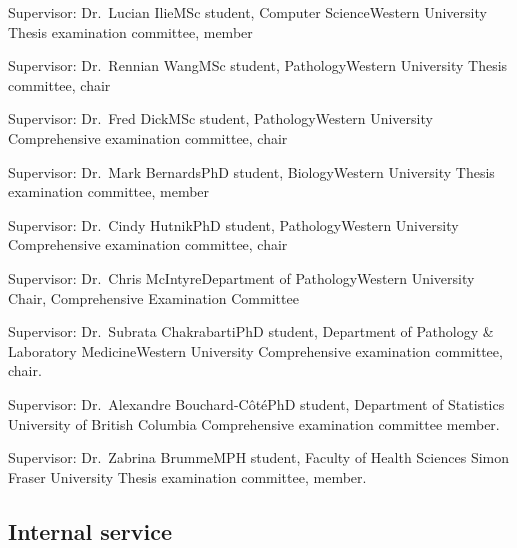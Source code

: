{Supervisor: Dr.~Lucian Ilie}{MSc student, Computer Science}{Western University}
{Thesis examination committee, member}


{Supervisor: Dr.~Rennian Wang}{MSc student, Pathology}{Western University}
{Thesis committee, chair}

{Supervisor: Dr.~Fred Dick}{MSc student, Pathology}{Western University}
{Comprehensive examination committee, chair}

{Supervisor: Dr.~Mark Bernards}{PhD student, Biology}{Western University}
{Thesis examination committee, member}

{Supervisor: Dr.~Cindy Hutnik}{PhD student, Pathology}{Western University}
{Comprehensive examination committee, chair}



{Supervisor: Dr.~Chris McIntyre}{Department of Pathology}{Western University}
{Chair, Comprehensive Examination Committee}


{Supervisor: Dr.~Subrata Chakrabarti}{PhD student, Department of Pathology \& Laboratory Medicine}{Western University}
{Comprehensive examination committee, chair.}


{Supervisor: Dr.~Alexandre Bouchard-C\^ot\'e}{PhD student, Department of Statistics}
{University of British Columbia}
{Comprehensive examination committee member.}

{Supervisor: Dr.~Zabrina Brumme}{MPH student, Faculty of Health Sciences}
{Simon Fraser University}
{Thesis examination committee, member.}



\subsection {Internal service}




